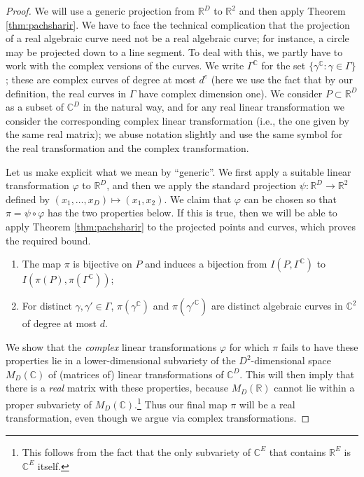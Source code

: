 \documentclass[12pt]{article}
\newcommand{\RR}{\mathbb R}
\newcommand{\CC}{\mathbb C}
\begin{document}
\begin{proof}
 We will use a generic projection from $\RR^D$ to $\RR^2$ and then apply Theorem \ref{thm:pachsharir}.
We have to face the technical complication that the projection of a real algebraic curve need not be a real algebraic curve; for instance, a circle may be projected down to a line segment.
To deal with this, we partly have to work with the complex versions of the curves.
We write $\Gamma^\CC$ for the set $\{\gamma^\CC: \gamma\in \Gamma\}$; these are complex curves of degree at most $d^e$ (here we use the fact that by our definition, the real curves in $\Gamma$ have complex dimension one).
We consider $P\subset \RR^D$ as a subset of $\CC^D$ in the natural way, and for any real linear transformation we consider the corresponding complex linear transformation (i.e., the one given by the same real matrix); we abuse notation slightly and use the same symbol for the real transformation and the complex transformation.

Let us make explicit what we mean by ``generic''.
We first apply a suitable linear transformation $\varphi$ to $\RR^D$, and then we apply the standard projection $\psi:\RR^D\to\RR^2$ defined by $(x_1,\ldots, x_D)\mapsto(x_1,x_2)$. 
 We claim that $\varphi$ can be chosen so that $\pi = \psi\circ\varphi$ has the two properties below.
 If this is true, then we will be able to apply Theorem \ref{thm:pachsharir} to the projected points and curves, which proves the required bound.
 
  \begin{enumerate}
  \item[(1)]\label{eq:bijective} The map $\pi$ is bijective on $P$ and
  induces a bijection from $I(P,\Gamma^\CC)$ to $I(\pi(P),\pi(\Gamma^\CC))$;
  \item[(2)] For distinct $\gamma,\gamma'\in\Gamma$, $\pi(\gamma^\CC)$ and $\pi(\gamma'^\CC)$ are distinct algebraic curves in $\CC^2$ of degree at most $d$.
  \end{enumerate} 
 
We show that the \emph{complex} linear transformations $\varphi$ for which $\pi$ fails to have these properties lie in a lower-dimensional subvariety of the $D^2$-dimensional space $M_D(\CC)$ of (matrices of) linear transformations of $\CC^D$.
 This will then imply that there is a \emph{real} matrix with these properties, because $M_D(\RR)$ cannot lie within a proper subvariety of $M_D(\CC)$.\footnote{This follows from the fact that the only subvariety of $\CC^E$ that contains $\RR^E$ is $\CC^E$ itself.}
 Thus our final map $\pi$ will be a real transformation, even though we argue via complex transformations.
 

\end{proof}
\end{document}
